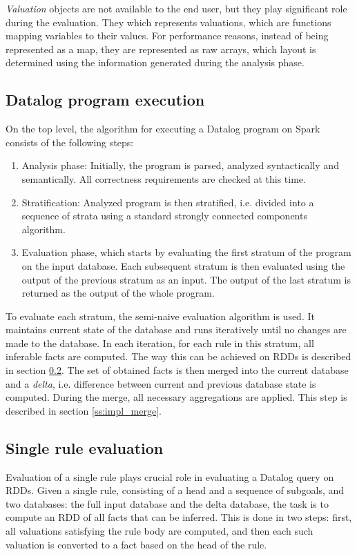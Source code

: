 \emph{Valuation} objects are not available to the end user, but they play significant role during the evaluation. They which represents valuations, which are functions mapping variables to their values. For performance reasons, instead of being represented as a map, they are represented as raw arrays, which layout is determined using the information generated during the analysis phase.

\subsection{Datalog program execution}

On the top level, the algorithm for executing a Datalog program on Spark consists of the following steps:

\begin{enumerate}
\item Analysis phase: Initially, the program is parsed, analyzed syntactically and semantically. All correctness requirements are checked at this time.

\item Stratification: Analyzed program is then stratified, i.e. divided into a sequence of strata using a standard strongly connected components algorithm.

\item Evaluation phase, which starts by evaluating the first stratum of the program on the input database. Each subsequent stratum is then evaluated using the output of the previous stratum as an input. The output of the last stratum is returned as the output of the whole program.

\end{enumerate}

To evaluate each stratum, the semi-naive evaluation algorithm is used. It maintains current state of the database and runs iteratively until no changes are made to the database. In each iteration, for each rule in this stratum, all inferable facts are computed. The way this can be achieved on RDDs is described in section \ref{ss:impl_evalrule}. The set of obtained facts is then merged into the current database and a \emph{delta}, i.e. difference between current and previous database state is computed. During the merge, all necessary aggregations are applied. This step is described in section \ref{ss:impl_merge}.

\subsection{Single rule evaluation}\label{ss:impl_evalrule}
Evaluation of a single rule plays crucial role in evaluating a Datalog query on RDDs. Given a single rule, consisting of a head and a sequence of subgoals, and two databases: the full input database and the delta database, the task is to compute an RDD of all facts that can be inferred. This is done in two steps: first, all valuations satisfying the rule body are computed, and then each such valuation is converted to a fact based on the head of the rule.

